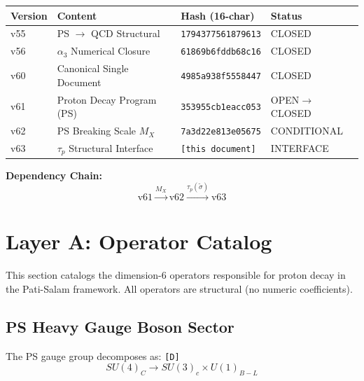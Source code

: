 \documentclass[11pt,a4paper]{article}
\newcommand{\tagD}{\textcolor{green!50!black}{\texttt{[D]}}}
\theoremstyle{definition}
\begin{document}
\begin{center}
\begin{tabular}{llll}
\toprule
Version & Content & Hash (16-char) & Status \\
\midrule
v55 & PS $\to$ QCD Structural & \texttt{1794377561879613} & CLOSED \\
v56 & $\alpha_3$ Numerical Closure & \texttt{61869b6fddb68c16} & CLOSED \\
v60 & Canonical Single Document & \texttt{4985a938f5558447} & CLOSED \\
v61 & Proton Decay Program (PS) & \texttt{353955cb1eacc053} & OPEN$\to$CLOSED \\
v62 & PS Breaking Scale $M_X$ & \texttt{7a3d22e813e05675} & CONDITIONAL \\
v63 & $\tau_p$ Structural Interface & \texttt{[this document]} & INTERFACE \\
\bottomrule
\end{tabular}
\end{center}

\textbf{Dependency Chain:}
\begin{equation}
\label{eq:dependency-chain}
\text{v61} \xrightarrow{M_X} \text{v62} \xrightarrow{\tau_p(\tilde{\sigma})} \text{v63}
\end{equation}

\section{Layer A: Operator Catalog}
\label{sec:operator-catalog}

\begin{operatorbox}
This section catalogs the dimension-6 operators responsible for proton decay
in the Pati-Salam framework. All operators are structural (no numeric coefficients).
\end{operatorbox}

\subsection{PS Heavy Gauge Boson Sector}
\label{subsec:heavy-sector}

The PS gauge group decomposes as: \tagD{}
\begin{equation}
\label{eq:ps-decomposition}
SU(4)_C \to SU(3)_c \times U(1)_{B-L}
\end{equation}
\end{document}
